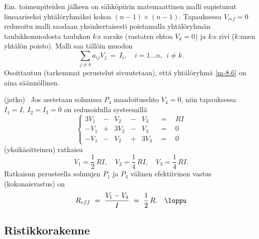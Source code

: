 Em. toimenpiteiden jälkeen on sähköpiirin matemaattinen malli supistunut lineaariseksi 
yhtälöryhmäksi kokoa $(n-1) \times (n-1)$. Tapauksessa $V_{ref} = 0$ redusoitu malli saadaan
yksinkertaisesti poistamalla yhtälöryhmän taulukkomuodosta taulukon $k$:s sarake
(vastaten ehtoa $V_k = 0$) ja $k$:s rivi ($k$:nnen yhtälön poisto). Malli saa tällöin muodon 
\begin{equation} \label{m-8.6}
\sum_{j \neq k} a_{ij} V_j\ =\ I_i, \quad i = 1 \ldots n,\ \ i \neq k.
\end{equation}
Osoittautuu (tarkemmat perustelut sivuutetaan), että yhtälöryhmä \eqref{m-8.6} on aina 
säännöllinen.
\jatko \begin{Exa} (jatko) \ Jos asetetaan solmussa $P_4$ maadoitusehto $V_4 = 0$, niin 
tapauksessa $I_1 = I,\ I_2 = I_3 = 0$ on redusoidulla systeemillä
\[ \left\{ \begin{array}{rrrrrrl}  3V_1&-& V_2&-& V_3&\ \ =\ \ &RI\\
                                  -V_1&+&3V_2&-& V_3&\ \ =\ \ & 0\\
                                  -V_1&-& V_2&+&3V_3&\ \ =\ \ &0
\end{array} \right. \] 
(yksikäsitteinen) ratkaisu
\[
V_1 = \frac{1}{2}\,RI, \quad V_2 = \frac{1}{4}\,RI, \quad V_3 = \frac{1}{4}\,RI.
\]
Ratkaisun perusteella solmujen $P_1$ ja $P_4$ välinen efektiivinen vastus (kokonaisvastus) on
\[
R_{eff}\ =\ \frac{V_1 - V_4}{I}\ =\ \frac{1}{2}\,R. \quad \loppu
\] \end{Exa}

\subsection*{Ristikkorakenne}

